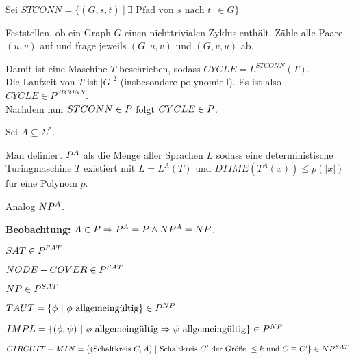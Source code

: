 \begin{beispiel}
    
    Sei $STCONN = \{ (G, s, t) \ |\  \exists \text{ Pfad von } s \text{ nach } t \ \ \in G \} $

    Feststellen, ob ein Graph $G$ einen nichttrivialen Zyklus enthält. Zähle alle Paare $(u,v)$ auf und frage jeweils $(G, u, v)$ und $(G, v, u)$ ab.

    Damit ist eine Maschine $T$ beschrieben, sodass $CYCLE = L^{STCONN}(T)$.\\
    Die Laufzeit von $T$ ist $|G|^2$ (insbesondere polynomiell). Es ist also $CYCLE \in P^{STCONN}$.\\
    Nachdem nun $STCONN \in P$ folgt $CYCLE \in P$.

\end{beispiel}


\begin{definition}

    Sei $A \subseteq \Sigma^\ast$.

    Man definiert $P^A$ als die Menge aller Sprachen $L$ sodass eine deterministische Turingmaschine $T$ existiert mit $L = L^A(T)$ und $DTIME(T^A(x)) \leq p(|x|)$ für eine Polynom $p$.

    Analog $NP^A$.
    
\end{definition}

\textbf{Beobachtung:}
$A \in P \Rightarrow P^A = P \land NP^A = NP$.

    
\begin{beispiel}
    
    $SAT \in P^{SAT}$

    $NODE-COVER \in P^{SAT}$

    $NP \in P^{SAT}$


    $ TAUT = \{ \phi \ |\  \phi \text{ allgemeingültig} \} \in P^{NP}$


    $ IMPL = \{ (\phi, \psi) \ |\  \phi \text{ allgemeingültig} \Rightarrow \psi \text{ allgemeingültig} \} \in P^{NP} $


    $ CIRCUIT-MIN = \{  (\text{Schaltkreis } C,  A) \ | \ 
            \text{Schaltkreis } C' \text{ der Größe } \leq k \text{ und } C \equiv C' \}  \in \ComplexityClassNP^{SAT}$

\end{beispiel}



